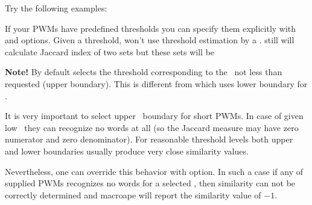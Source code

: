 Try the following examples:


If your PWMs have predefined thresholds you can specify them explicitly with  and  options. Given a threshold,  won't use threshold estimation by a \pvalue.  still will calculate Jaccard index of two sets but these sets will be


{\small
\textbf{Note!} By default  selects the threshold corresponding to the \pvalue\ not 
less than requested (upper boundary). This is different from  which uses 
lower boundary for \pvalue. 

It is very important to select upper \pvalue\ boundary for short PWMs. In case of given 
low \pvalues\ they can recognize no words at all (so the Jaccard measure may have zero 
numerator and zero denominator). For reasonable threshold levels both upper and lower 
boundaries usually produce very close similarity values. 

Nevertheless, one can override this behavior with  option. In such a case if 
any of supplied PWMs recognizes no words for a selected \pvalue, then similarity can not be 
correctly determined and macroape will report the similarity value of $-1$. 
}


